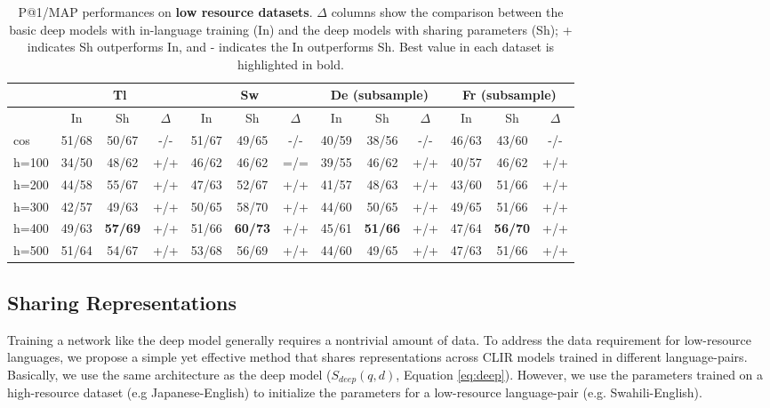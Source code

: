\documentclass[11pt,a4paper]{article}
\begin{document}
\begin{table*}[h]
	\begin{center}		
		\begin{tabular}{ |l || c | c | c | c | c | c | c | c | c | c | c | c |} \hline
			&
			\multicolumn{3}{c|}{Tl} &
			\multicolumn{3}{c|}{Sw} &
			\multicolumn{3}{c|}{De (subsample)} &				
			\multicolumn{3}{c|}{Fr (subsample)} \\ \hline
			& In & Sh & $\Delta$ & In & Sh & $\Delta$ & In & Sh & $\Delta$ & In & Sh & $\Delta$   \\ \hline\hline
			cos & 51/68 & 50/67 & -/- & 51/67& 49/65 & -/- & 40/59 & 38/56 & -/- & 46/63& 43/60 & -/- \\ \hline\hline
			h=100 & 34/50 & 48/62 & +/+ & 46/62 & 46/62 & =/= & 39/55 & 46/62&  +/+ & 40/57 & 46/62& +/+ \\ \hline
			h=200 & 44/58 & 55/67 & +/+ & 47/63 & 52/67 & +/+ & 41/57 & 48/63&  +/+ & 43/60& 51/66& +/+ \\ \hline
			h=300 & 42/57 & 49/63 & +/+ & 50/65 & 58/70 & +/+ & 44/60 & 50/65&  +/+ & 49/65& 51/66& +/+ \\ \hline
			h=400 & 49/63 & \bf57/69 & +/+ & 51/66 & \bf60/73 & +/+ & 45/61 & \bf51/66&  +/+ & 47/64& \bf56/70& +/+ \\ \hline
			h=500 & 51/64 & 54/67 & +/+ & 53/68 & 56/69 & +/+ & 44/60 & 49/65&  +/+ & 47/63& 51/66& +/+ \\ \hline			 
		\end{tabular}
		\caption{\label {tab:result_for_low_resource} P@1/MAP performances on \textbf{low resource datasets}. $\Delta$ columns show the comparison between the basic deep models with in-language training (In) and the deep models with sharing parameters (Sh); + indicates Sh outperforms In, and - indicates the In outperforms Sh. Best value in each dataset is highlighted in bold.}
	\end{center}
\end{table*}
%

\subsection{Sharing Representations}
\label{sec:sharing}

Training a network like the deep model generally requires a nontrivial amount of data. To address the data requirement for low-resource languages, we propose a simple yet effective method that shares representations across CLIR models trained in different language-pairs.
Basically, we use the same architecture as the deep model ($S_{deep}(q,d)$, Equation \ref{eq:deep}).
However, we use the parameters trained on a high-resource dataset (e.g Japanese-English) to initialize the parameters for a low-resource language-pair (e.g. Swahili-English). 
\end{document}
